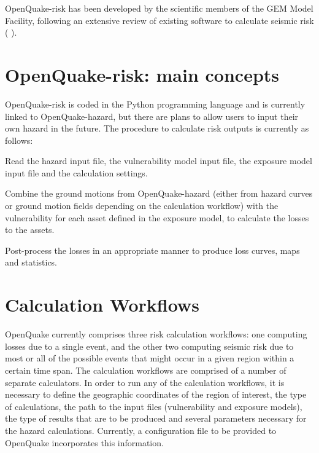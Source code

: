 OpenQuake-risk has been developed by the scientific members of the GEM Model Facility, following an extensive review of existing software to calculate seismic risk (\citeauthor{crowleyetal2010} ). 
%
\section{OpenQuake-risk: main concepts}
OpenQuake-risk is coded in the Python programming language and is currently linked to OpenQuake-hazard, but there are plans to allow users to input their own hazard in the future. The procedure to calculate risk outputs is currently as follows:
\begin{enumerate}

Read the hazard input file, the vulnerability model input file, the exposure model input file and the calculation settings.

Combine the ground motions from OpenQuake-hazard (either from hazard curves or ground motion fields depending on the calculation workflow) with the vulnerability for each asset defined in the exposure model, to calculate the losses to the assets.

Post-process the losses in an appropriate manner to produce loss curves, maps and statistics. 

\end{enumerate}
%
\section{Calculation Workflows}
OpenQuake currently comprises three risk calculation workflows: one computing losses due to a single event, and the other two computing seismic risk due to most or all of the possible events that might occur in a given region within a certain time span. The calculation workflows are comprised of a number of separate calculators. In order to run any of the calculation workflows, it is necessary to define the geographic coordinates of the region of interest, the type of calculations, the path to the input files (vulnerability and exposure models), the type of results that are to be produced and several parameters necessary for the hazard calculations. Currently, a configuration file to be provided to OpenQuake incorporates this information.

